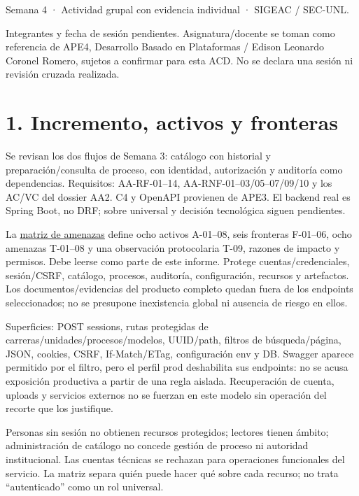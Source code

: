 \documentclass[12pt,a4paper]{report}
\begin{document}

Semana 4 · Actividad grupal con evidencia individual · SIGEAC / SEC-UNL.

Integrantes y fecha de sesión pendientes. Asignatura/docente se toman
como referencia de APE4, Desarrollo Basado en Plataformas / Edison
Leonardo Coronel Romero, sujetos a confirmar para esta ACD. No se
declara una sesión ni revisión cruzada realizada.

\chapter{1. Incremento, activos y
fronteras}\label{ACD4-semana-4-1-incremento-activos-y-fronteras}

Se revisan los dos flujos de Semana 3: catálogo con historial y
preparación/consulta de proceso, con identidad, autorización y auditoría
como dependencias. Requisitos: AA-RF-01--14, AA-RNF-01--03/05--07/09/10
y los AC/VC del dossier AA2. C4 y OpenAPI provienen de APE3. El backend
real es Spring Boot, no DRF; sobre universal y decisión tecnológica
siguen pendientes.

La \href{../soporte-semanas-4-5/MATRIZ_AMENAZAS.md}{matriz de amenazas}
define ocho activos A-01--08, seis fronteras F-01--06, ocho amenazas
T-01--08 y una observación protocolaria T-09, razones de impacto y
permisos. Debe leerse como parte de este informe. Protege
cuentas/credenciales, sesión/CSRF, catálogo, procesos, auditoría,
configuración, recursos y artefactos. Los documentos/evidencias del
producto completo quedan fuera de los endpoints seleccionados; no se
presupone inexistencia global ni ausencia de riesgo en ellos.

Superficies: POST sessions, rutas protegidas de
carreras/unidades/procesos/modelos, UUID/path, filtros de
búsqueda/página, JSON, cookies, CSRF, If-Match/ETag, configuración env y
DB. Swagger aparece permitido por el filtro, pero el perfil prod
deshabilita sus endpoints: no se acusa exposición productiva a partir de
una regla aislada. Recuperación de cuenta, uploads y servicios externos
no se fuerzan en este modelo sin operación del recorte que los
justifique.

Personas sin sesión no obtienen recursos protegidos; lectores tienen
ámbito; administración de catálogo no concede gestión de proceso ni
autoridad institucional. Las cuentas técnicas se rechazan para
operaciones funcionales del servicio. La matriz separa quién puede hacer
qué sobre cada recurso; no trata ``autenticado'' como un rol universal.
\end{document}

